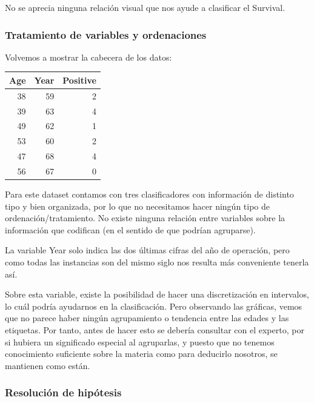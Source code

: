 No se aprecia ninguna relación visual que nos ayude a clasificar el Survival.

\newpage

\subsubsection{Tratamiento de variables y ordenaciones}

Volvemos a mostrar la cabecera de los datos:

\vspace{\baselineskip}

\begin{tabular}{r|r|r}
\hline
Age & Year & Positive\\
\hline
38 & 59 & 2\\
\hline
39 & 63 & 4\\
\hline
49 & 62 & 1\\
\hline
53 & 60 & 2\\
\hline
47 & 68 & 4\\
\hline
56 & 67 & 0\\
\hline
\end{tabular}

\vspace{\baselineskip}

Para este dataset contamos con tres clasificadores con información de distinto tipo y bien organizada, por lo que no necesitamos hacer ningún tipo de ordenación/tratamiento. No existe ninguna relación entre variables sobre la información que codifican (en el sentido de que
podrían agruparse).

La variable Year solo indica las dos últimas cifras del año de operación, pero como todas las instancias son del mismo siglo nos resulta más conveniente tenerla así.

\vspace{\baselineskip}

Sobre esta variable, existe la posibilidad de hacer una discretización en intervalos, lo cuál podría ayudarnos en la clasificación. Pero observando las gráficas, vemos que no parece haber ningún agrupamiento o tendencia entre las edades y las etiquetas.
Por tanto, antes de hacer esto se debería consultar con el experto, por si hubiera un significado especial al agruparlas, y puesto que no tenemos conocimiento suficiente sobre la materia como para deducirlo nosotros, se mantienen como están.

\newpage

\subsubsection{Resolución de hipótesis}

